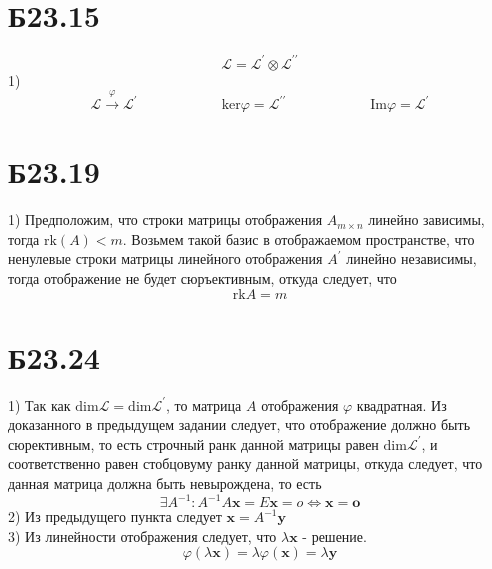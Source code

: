 \section*{Б23.15}$$\mathcal{L}=\mathcal{L}^{\prime}\otimes\mathcal{L}^{\prime\prime}$$1)
$$\mathcal{L}\overset{\varphi}{\to}\mathcal{L}^{\prime}\qquad\qquad\qquad\mathrm{ker}\varphi=\mathcal{L}^{\prime\prime}\qquad\qquad\qquad\mathrm{Im}\varphi=\mathcal{L}^{\prime}$$
\section*{Б23.19}1)
Предположим, что строки матрицы отображения $A_{m\times n}$ линейно зависимы, тогда $\mathrm{rk}(A)<m$. Возьмем такой базис в отображаемом пространстве, что ненулевые строки матрицы линейного отображения $A^{\prime}$ линейно независимы, тогда отображение не будет сюръективным, откуда следует, что $$\mathrm{rk}A=m$$
\section*{Б23.24}
1) Так как $\mathrm{dim}\mathcal{L}=\mathrm{dim}\mathcal{L}^{\prime}$, то матрица $A$ отображения $\varphi$ квадратная. Из доказанного в предыдущем задании следует, что отображение должно быть сюрективным, то есть строчный ранк данной матрицы равен $\mathrm{dim}\mathcal{L}^{\prime}$, и соответственно равен стобцовуму ранку данной матрицы, откуда следует, что данная матрица должна быть невырождена, то есть $$\exists A^{-1}:A^{-1}A\textbf{x}=E\textbf{x}=o\Leftrightarrow \textbf{x}=\textbf{o}$$
2) Из предыдущего пункта следует $\textbf{x}=A^{-1}\textbf{y}$\\
3) Из линейности отображения следует, что $\lambda \textbf{x}$ - решение.$$\varphi(\lambda\textbf{x})=\lambda\varphi(\textbf{x})=\lambda \textbf{y}$$
